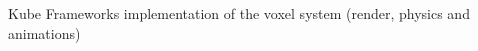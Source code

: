 Kube Framework\textquotesingle{}s implementation of the voxel system (render, physics and animations) 